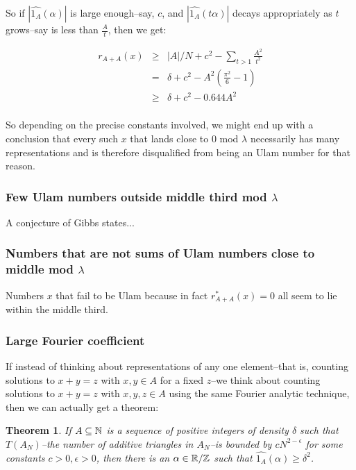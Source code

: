 \documentclass{article}
\newtheorem{theorem}{Theorem}[section]
\theoremstyle{definition}
\theoremstyle{remark}
\numberwithin{equation}{section}
\begin{document}
{So if $|\widehat{1_A}(\alpha)|$ is large enough--say, $c$, and
$|\widehat{1_A}(t \alpha)|$ decays appropriately as $t$ grows--say is
less than $\frac{A}{t}$, then we get:



\begin{eqnarray*}
r_{A+A}(x) &\geq& |A|/N + c^2 - \sum_{t > 1}\frac{A^2}{t^2}\\
&=& \delta + c^2 - A^2\left(\frac{\pi^2}{6}-1\right)\\
&\geq& \delta + c^2 - 0.644 A^2\\
\end{eqnarray*}

So depending on the precise constants involved, we might end up with a
conclusion that every such $x$ that lands close to 0 mod $\lambda$
necessarily has many representations and is therefore disqualified
from being an Ulam number for that reason.  

\subsubsection{Few Ulam numbers outside middle third mod $\lambda$}

A conjecture of Gibbs states...

\subsubsection{Numbers that are not sums of Ulam numbers close to middle mod $\lambda$}

Numbers $x$ that fail to be Ulam because in fact $r^*_{A+A}(x) = 0$
all seem to lie within the middle third.  

\subsubsection{Large Fourier coefficient}

If instead of thinking about representations of any one element--that
is, counting solutions to $x+y=z$ with $x,y \in A$ for a fixed $z$--we
think about counting solutions to $x+y=z$ with $x,y,z \in A$ using the
same Fourier analytic technique, then we can actually get a theorem: 

\begin{theorem}If $A \subseteq \mathbb{N}$ is a sequence of positive integers
  of density $\delta$ such that $T(A_N)$--the number of additive
  triangles in $A_N$--is bounded by $c N^{2-\epsilon}$ for some
  constants $c > 0, \epsilon > 0$, then there is an $\alpha \in \mathbb{R}/\mathbb{Z}$
  such that $\widehat{1_A}(\alpha) \geq \delta^2$.\end{theorem}

}
\end{document}
